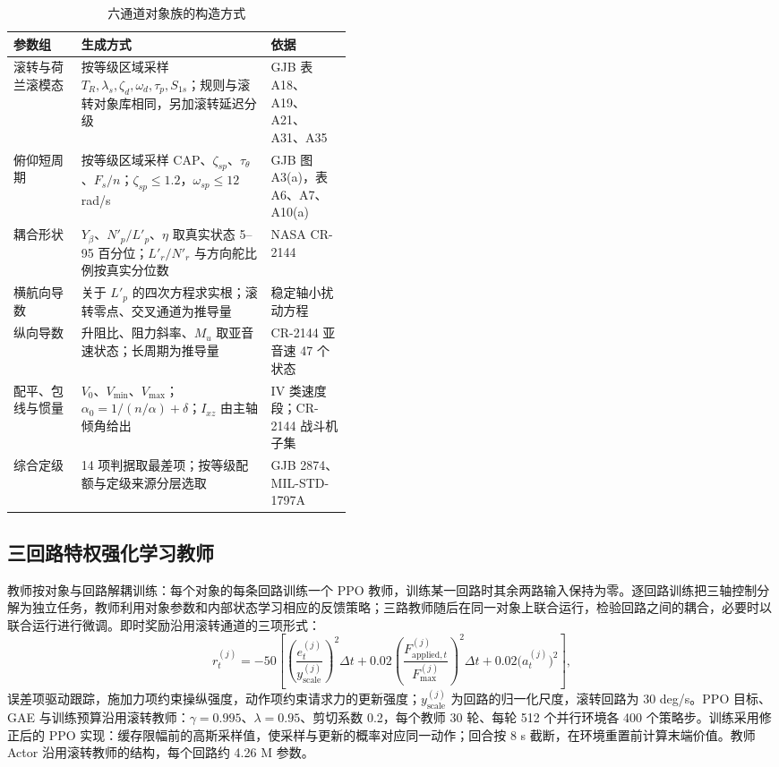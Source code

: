 \documentclass[UTF8,a4paper,11pt,fontset=fandol,scheme=plain]{ctexart}
\begin{document}
\begin{table}[H]
\centering\small
\caption{六通道对象族的构造方式}\label{tab:build}
\begin{tabularx}{\linewidth}{@{}>{\raggedright\arraybackslash}p{0.2\linewidth}Y>{\raggedright\arraybackslash}p{0.24\linewidth}@{}}
\toprule
参数组 & 生成方式 & 依据 \\
\midrule
滚转与荷兰滚模态 & 按等级区域采样 \(T_R,\lambda_s,\zeta_d,\omega_d,\tau_p,S_{1s}\)；规则与滚转对象库相同，另加滚转延迟分级 & GJB 表 A18、A19、A21、A31、A35 \\
俯仰短周期 & 按等级区域采样 CAP、\(\zeta_{sp}\)、\(\tau_\theta\)、\(F_s/n\)；\(\zeta_{sp}\le1.2\)，\(\omega_{sp}\le12\) rad/s & GJB 图 A3(a)，表 A6、A7、A10(a) \\
耦合形状 & \(Y_\beta\)、\(N'_p/L'_p\)、\(\eta\) 取真实状态 5–95 百分位；\(L'_r/N'_r\) 与方向舵比例按真实分位数 & NASA CR-2144 \\
横航向导数 & 关于 \(L'_p\) 的四次方程求实根；滚转零点、交叉通道为推导量 & 稳定轴小扰动方程 \\
纵向导数 & 升阻比、阻力斜率、\(M_u\) 取亚音速状态；长周期为推导量 & CR-2144 亚音速 47 个状态 \\
配平、包线与惯量 & \(V_0\)、\(V_{\min}\)、\(V_{\max}\)；\(\alpha_0=1/(n/\alpha)+\delta\)；\(I_{xz}\) 由主轴倾角给出 & IV 类速度段；CR-2144 战斗机子集 \\
综合定级 & 14 项判据取最差项；按等级配额与定级来源分层选取 & GJB 2874、MIL-STD-1797A \\
\bottomrule
\end{tabularx}
\end{table}

\subsection{三回路特权强化学习教师}
\label{sec:teacher}
教师按对象与回路解耦训练：每个对象的每条回路训练一个 PPO 教师，训练某一回路时其余两路输入保持为零。逐回路训练把三轴控制分解为独立任务，教师利用对象参数和内部状态学习相应的反馈策略；三路教师随后在同一对象上联合运行，检验回路之间的耦合，必要时以联合运行进行微调。即时奖励沿用滚转通道的三项形式：
\begin{equation}
r^{(j)}_t=-50\left[\left(\frac{e^{(j)}_t}{y^{(j)}_{\mathrm{scale}}}\right)^2\Delta t+0.02\left(\frac{F^{(j)}_{\mathrm{applied},t}}{F^{(j)}_{\max}}\right)^2\Delta t+0.02\bigl(a^{(j)}_t\bigr)^2\right],
\end{equation}
误差项驱动跟踪，施加力项约束操纵强度，动作项约束请求力的更新强度；\(y^{(j)}_{\mathrm{scale}}\) 为回路的归一化尺度，滚转回路为 30 deg/s。PPO 目标、GAE 与训练预算沿用滚转教师：\(\gamma=0.995\)、\(\lambda=0.95\)、剪切系数 0.2，每个教师 30 轮、每轮 512 个并行环境各 400 个策略步。训练采用修正后的 PPO 实现：缓存限幅前的高斯采样值，使采样与更新的概率对应同一动作；回合按 8 s 截断，在环境重置前计算末端价值。教师 Actor 沿用滚转教师的结构，每个回路约 4.26 M 参数。
\end{document}
